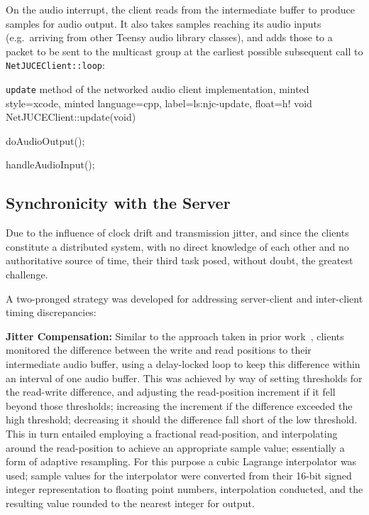 On the audio interrupt, the client reads from the intermediate buffer to
produce samples for audio output.
It also takes samples reaching its audio inputs (e.g.\ arriving from other
Teensy audio library classes), and adds those to a packet to be sent to the
multicast group at the earliest possible subsequent call to
\texttt{NetJUCEClient::loop}:
\begin{codelisting}{
    \texttt{update} method of the networked audio client implementation,
    minted style=xcode,
    minted language=cpp,
    label=ls:njc-update,
    float=h!
}
    void NetJUCEClient::update(void) {
        doAudioOutput();

        handleAudioInput();
    }
\end{codelisting}

\subsection{Synchronicity with the Server}\label{subsec:client-sync}

Due to the influence of clock drift and transmission jitter, and since the
clients constitute a distributed system, with no direct knowledge of each other
and no authoritative source of time, their third task posed, without doubt,
the greatest challenge.

A two-pronged strategy was developed for addressing server-client and
inter-client timing discrepancies:

\textbf{Jitter Compensation:}
Similar to the approach taken in prior
work~\citep{rushton_microcontroller-based_2023}, clients monitored the difference
between the write and read positions to their intermediate audio buffer,
using a delay-locked loop to keep this difference within an interval of one
audio buffer.
This was achieved by way of setting thresholds for the read-write difference,
and adjusting the read-position increment if it fell beyond those thresholds;
increasing the increment if the difference exceeded the high threshold;
decreasing it should the difference fall short of the low threshold.
This in turn entailed employing a fractional read-position, and interpolating
around the read-position to achieve an appropriate sample value; essentially
a form of adaptive resampling.
For this purpose a cubic Lagrange interpolator was used; sample values for the
interpolator were converted from their 16-bit signed integer representation
to floating point numbers, interpolation conducted, and the resulting value
rounded to the nearest integer for output.

